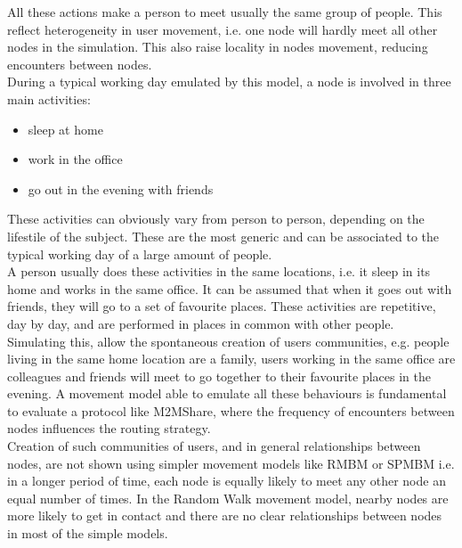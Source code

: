 All these actions make a person to meet usually the same group of people. This reflect heterogeneity in user movement, i.e. one node will hardly meet all other nodes in the simulation. This also raise locality in nodes movement, reducing encounters between nodes.
\\

During a typical working day emulated by this model, a node is involved in three main activities:
\begin{itemize}
\item sleep at home
\item work in the office
\item go out in the evening with friends
\end{itemize}
These activities can obviously vary from person to person, depending on the lifestile of the subject. These are the most generic and can be associated to the typical working day of a large amount of people.
\\

A person usually does these activities in the same locations, i.e. it sleep in its home and works in the same office. It can be assumed that when it goes out with friends, they will go to a set of favourite places. These activities are repetitive, day by day, and are performed in places in common with other people. Simulating this, allow the spontaneous creation of users communities, e.g. people living in the same home location are a family, users working in the same office are colleagues and friends will meet to go together to their favourite places in the evening. A movement model able to emulate all these behaviours is fundamental to evaluate a protocol like M2MShare, where the frequency of encounters between nodes influences the routing strategy.\\

Creation of such communities of users, and in general relationships between nodes, are not shown using simpler movement models like RMBM or SPMBM i.e. in a longer period of time, each node is equally likely to meet any other node an equal number of times. In the Random Walk movement model, nearby nodes are more likely to get in contact and there are no clear relationships between nodes in most of the simple models.
\\

